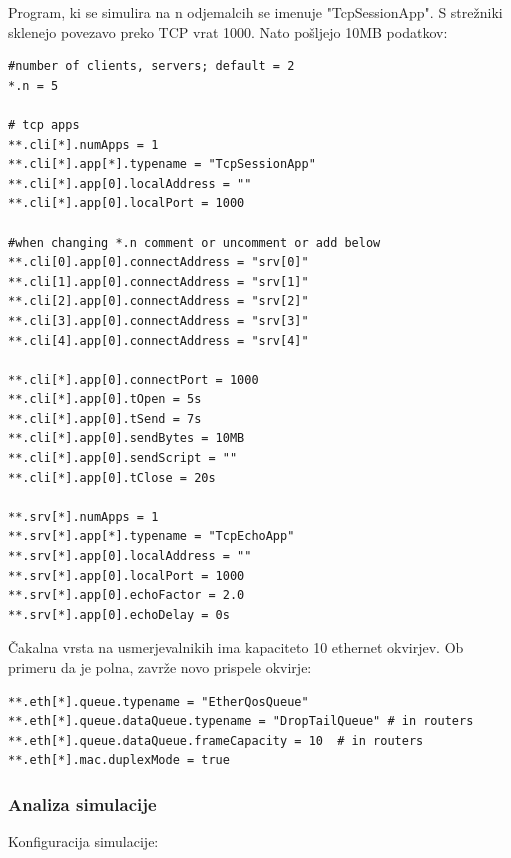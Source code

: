 \documentclass[11pt,a4paper,slovene]{myarticle}
\begin{document}
Program, ki se simulira na n odjemalcih se imenuje "TcpSessionApp". S strežniki sklenejo povezavo preko TCP vrat 1000. Nato pošljejo 10MB podatkov:
\begin{lstlisting}[h]
#number of clients, servers; default = 2
*.n = 5

# tcp apps
**.cli[*].numApps = 1
**.cli[*].app[*].typename = "TcpSessionApp"
**.cli[*].app[0].localAddress = ""
**.cli[*].app[0].localPort = 1000

#when changing *.n comment or uncomment or add below
**.cli[0].app[0].connectAddress = "srv[0]"
**.cli[1].app[0].connectAddress = "srv[1]"
**.cli[2].app[0].connectAddress = "srv[2]"
**.cli[3].app[0].connectAddress = "srv[3]"
**.cli[4].app[0].connectAddress = "srv[4]"

**.cli[*].app[0].connectPort = 1000
**.cli[*].app[0].tOpen = 5s
**.cli[*].app[0].tSend = 7s
**.cli[*].app[0].sendBytes = 10MB
**.cli[*].app[0].sendScript = ""
**.cli[*].app[0].tClose = 20s

**.srv[*].numApps = 1
**.srv[*].app[*].typename = "TcpEchoApp"
**.srv[*].app[0].localAddress = ""
**.srv[*].app[0].localPort = 1000
**.srv[*].app[0].echoFactor = 2.0
**.srv[*].app[0].echoDelay = 0s
\end{lstlisting}

Čakalna vrsta na usmerjevalnikih ima kapaciteto 10 ethernet okvirjev. Ob primeru da je polna, zavrže novo prispele okvirje:
\begin{lstlisting}[h]
**.eth[*].queue.typename = "EtherQosQueue"
**.eth[*].queue.dataQueue.typename = "DropTailQueue" # in routers
**.eth[*].queue.dataQueue.frameCapacity = 10  # in routers
**.eth[*].mac.duplexMode = true
\end{lstlisting}

\subsubsection{Analiza simulacije}

Konfiguracija simulacije:

\begin{lstlisting}

\end{lstlisting}
\end{document}
